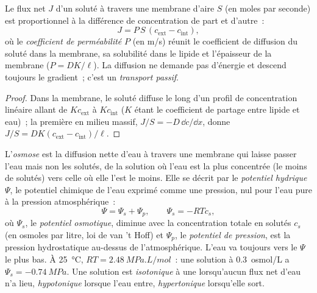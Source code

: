 \begin{theorem}\label{thm:b1:membranes-transport:fick}
Le flux net $J$ d'un soluté à travers une membrane d'aire $S$ (en moles
par seconde) est proportionnel à la différence de concentration de part
et d'autre~:
\[
J = P\,S\,(c_{\text{ext}} - c_{\text{int}}),
\]
où le \emph{coefficient de perméabilité} $P$ (en \unit{m/s}) réunit le
coefficient de diffusion du soluté dans la membrane, sa solubilité dans
le lipide et l'épaisseur de la membrane ($P = DK/\ell$). La diffusion ne
demande pas d'énergie et descend toujours le gradient~; c'est un
\emph{transport passif}.
\end{theorem}
\begin{proof}
Dans la membrane, le soluté diffuse le long d'un profil de concentration
linéaire allant de $Kc_{\text{ext}}$ à $Kc_{\text{int}}$ ($K$ étant le
coefficient de partage entre lipide et eau)~; la première  en
milieu massif, $J/S = -D\,\dd c/\dd x$, donne $J/S = DK(c_{\text{ext}} -
c_{\text{int}})/\ell$.
\end{proof}

\begin{definition}\label{def:b1:membranes-transport:osmosis}
L'\emph{osmose} est la diffusion nette d'eau à travers une
membrane qui laisse passer l'eau mais non les solutés, de la solution où
l'eau est la plus concentrée (le moins de solutés) vers celle où elle
l'est le moins. Elle se décrit par le \emph{potentiel
hydrique} $\Psi$, le potentiel chimique de
l'eau exprimé comme une pression, nul pour l'eau pure à la pression
atmosphérique~:
\[
\Psi = \Psi_s + \Psi_p, \qquad \Psi_s = -RTc_s ,
\]
où $\Psi_s$, le \emph{potentiel osmotique},
diminue avec la concentration totale en solutés $c_s$ (en osmoles par
litre, loi de van 't Hoff) et $\Psi_p$, le \emph{potentiel de
pression}, est la pression hydrostatique
au-dessus de l'atmosphérique. L'eau va toujours vers le $\Psi$ le plus
bas. À \qty{25}{\celsius}, $RT = \qty{2.48}{MPa.L/mol}$~: une solution à
\qty{0.3}{osmol/L} a $\Psi_s = \qty{-0.74}{MPa}$. Une solution est
\emph{isotonique} à une  lorsqu'aucun flux net
d'eau n'a lieu, \emph{hypotonique} lorsque l'eau entre,
\emph{hypertonique} lorsqu'elle sort.
\end{definition}

